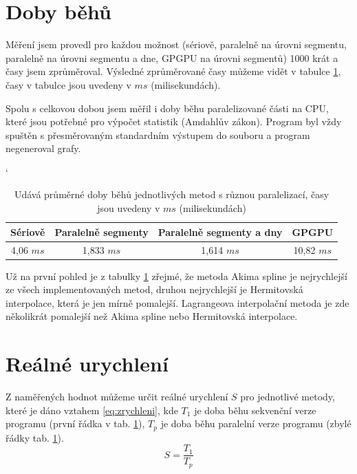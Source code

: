 \documentclass{article}
\begin{document}
	\section{Doby běhů}
	Měření jsem provedl pro každou možnost (sériově, paralelně na úrovni segmentu, paralelně na úrovni segmentu a dne, GPGPU na úrovni segmentů) 1000 krát a časy jsem zprůměroval.
	Výsledné zprůměrované časy můžeme vidět v tabulce \ref{tab:runtime}, časy v tabulce jsou uvedeny v $m s$ (milisekundách).
	\par Spolu s celkovou dobou jsem měřil i doby běhu paralelizované části na CPU, které jsou potřebné pro výpočet statistik (Amdahlův zákon). Program byl vždy spuštěn s přesměrovaným standardním výstupem do souboru a program negeneroval grafy.

	
	
	\begin{table}[h]
	\centering
	\catcode`
	\def\arraystretch{1.2}
	\begin{tabular}{|c|c|c|c|}
	\hline
	\textbf{Sériově} & \textbf{Paralelně segmenty} &  \textbf{Paralelně segmenty a dny} & \textbf{GPGPU}  \\ \hline
	\hline
	4,06 $m s$    		  & 1,833 $m s$                  & 1,614 $m s$     		  &        10,82 $m s$                   \\ \hline
	
	\end{tabular}
	\caption{Udává průměrné doby běhů jednotlivých metod s různou paralelizací, časy jsou uvedeny v $m s$ (milisekundách)}
	\label{tab:runtime}
	\end{table}
	
	
	\par Už na první pohled je z tabulky \ref{tab:runtime} zřejmé, že metoda Akima spline je nejrychlejší ze všech implementovaných metod, druhou nejrychlejší je Hermitovská interpolace, která je jen mírně pomalejší. Lagrangeova interpolační metoda je zde několikrát pomalejší než Akima spline nebo Hermitovská interpolace.
	
	\section{Reálné urychlení}
	\par  Z naměřených hodnot můžeme určit reálné urychlení $S$ pro jednotlivé metody, které je dáno vztahem \ref{eq:zrychleni}, kde $T_{1}$ je doba běhu sekvenční verze programu (první řádka v tab. \ref{tab:runtime}), $T_{p}$ je doba běhu paralelní verze programu (zbylé řádky tab. \ref{tab:runtime}).
	\begin{equation} 
	S=\frac{T_{1}}{T_{p}}
	\label{eq:zrychleni}
	\end{equation}
	
\end{document}

